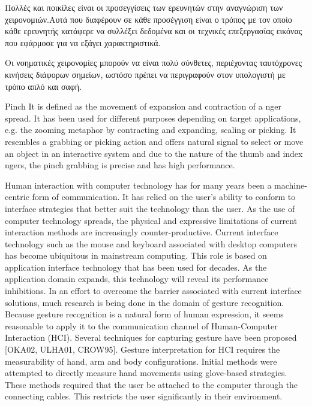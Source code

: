 Πολλές και ποικίλες είναι οι προσεγγίσεις των ερευνητών στην αναγνώριση των χειρονομιών.Αυτά που διαφέρουν σε κάθε προσέγγιση είναι ο τρόπος με τον οποίο κάθε ερευνητής κατάφερε να συλλέξει δεδομένα και οι τεχνικές επεξεργασίας εικόνας που εφάρμοσε για να εξάγει χαρακτηριστικά.

Οι νοηματικές χειρονομίες μπορούν να είναι πολύ σύνθετες, περιέχοντας ταυτόχρονες κινήσεις διάφορων σημείων, ωστόσο πρέπει να περιγραφούν στον υπολογιστή με τρόπο απλό και σαφή.

Pinch It is defined as the movement of expansion and contraction of a nger spread. It has been used for different purposes depending on target applications, e.g. the zooming metaphor by contracting and expanding, scaling or picking. It resembles a grabbing or picking action and offers natural signal to select or move an object in an interactive system and due to the nature of the thumb and index ngers, the pinch grabbing is precise and has high performance.


Human interaction with computer technology has for many years been a machine-centric form of communication. It has relied on the user’s ability to conform to interface strategies that better suit the technology than the user. As the use of computer technology spreads, the physical and expressive limitations of current interaction methods are increasingly counter-productive. Current interface technology such as the mouse and keyboard associated with desktop computers has become ubiquitous in mainstream computing. This role is based on application interface technology that has been used for decades. As the application domain expands, this technology will reveal its performance inhibitions. In an effort to overcome the barrier associated with current interface solutions, much research is being done in the domain of gesture recognition. Because gesture recognition is a natural form of human expression, it seems reasonable to apply it to the communication channel of Human-Computer Interaction (HCI). Several techniques for capturing gesture have been proposed [OKA02, ULHA01, CROW95]. Gesture interpretation for HCI requires the measurability of hand, arm and body configurations. Initial methods were attempted to directly measure hand movements using glove-based strategies. These methods required that the user be attached to the computer through the connecting cables. This restricts the user significantly in their environment.

